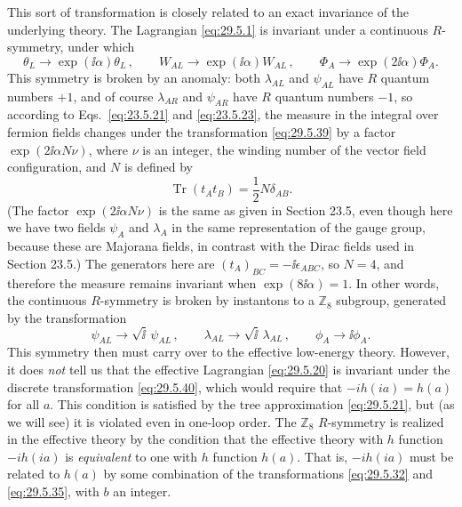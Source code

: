 This sort of transformation is closely related to an exact invariance of the
underlying theory. The Lagrangian \eqref{eq:29.5.1} is invariant under a
continuous \(R\)-symmetry, under which
\begin{equation}
  \theta_L\longrightarrow\exp(\ii\alpha)\theta_L\,,
  \qquad
  W_{AL}\longrightarrow\exp(\ii\alpha)W_{AL}\,,
  \qquad
  \Phi_A\longrightarrow\exp(2\ii\alpha)\Phi_A.
  \tag{29.5.39}\label{eq:29.5.39}
\end{equation}
This symmetry is broken by an anomaly: both \(\lambda_{AL}\) and
\(\psi_{AL}\) have \(R\) quantum numbers \(+1\), and of course
\(\lambda_{AR}\) and \(\psi_{AR}\) have \(R\) quantum numbers \(-1\), so
according to Eqs.~\eqref{eq:23.5.21} and \eqref{eq:23.5.23}, the measure in
the integral over fermion fields changes under the transformation
\eqref{eq:29.5.39} by a factor \(\exp(2\ii\alpha N\nu)\), where \(\nu\) is an
integer, the winding number of the vector field configuration, and \(N\) is
defined by
\[
  \operatorname{Tr}(t_At_B)=\frac12N\delta_{AB}.
\]
(The factor \(\exp(2\ii\alpha N\nu)\) is the same as given in Section 23.5,
even though here we have two fields \(\psi_A\) and \(\lambda_A\) in the same
representation of the gauge group, because these are Majorana fields, in
contrast with the Dirac fields used in Section 23.5.) The generators here
are \((t_A)_{BC}=-\ii\epsilon_{ABC}\), so \(N=4\), and therefore the measure
remains invariant when \(\exp(8\ii\alpha)=1\). In other words, the continuous
\(R\)-symmetry is broken by instantons to a \(\mathbb{Z}_8\) subgroup,
generated by the transformation
\begin{equation}
  \psi_{AL}\longrightarrow\sqrt{\ii}\,\psi_{AL}\,,
  \qquad
  \lambda_{AL}\longrightarrow\sqrt{\ii}\,\lambda_{AL}\,,
  \qquad
  \phi_A\longrightarrow \ii\phi_A.
  \tag{29.5.40}\label{eq:29.5.40}
\end{equation}
This symmetry then must carry over to the effective low-energy theory.
However, it does \textit{not} tell us that the effective Lagrangian
\eqref{eq:29.5.20} is invariant under the discrete transformation
\eqref{eq:29.5.40}, which would require that \(-ih(ia)=h(a)\) for all
\(a\). This condition is satisfied by the tree approximation
\eqref{eq:29.5.21}, but (as we will see) it is violated even in one-loop
order. The \(\mathbb{Z}_8\) \(R\)-symmetry is realized in the effective
theory by the condition that the effective theory with \(h\) function
\(-ih(ia)\) is \textit{equivalent} to one with \(h\) function \(h(a)\).
That is, \(-ih(ia)\) must be related to \(h(a)\) by some combination of the
transformations \eqref{eq:29.5.32} and \eqref{eq:29.5.35}, with \(b\) an
integer.

